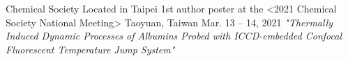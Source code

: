 


\begin{cventries}


\cventry
{Chemical Society Located in Taipei} %
{1st author poster at the <2021 Chemical Society National Meeting>} %
{Taoyuan, Taiwan} %
{Mar. 13 -- 14, 2021} %
{ %
\textit{"Thermally Induced Dynamic Processes of Albumins Probed with ICCD-embedded Confocal Fluorescent Temperature Jump System"}
}


\end{cventries}